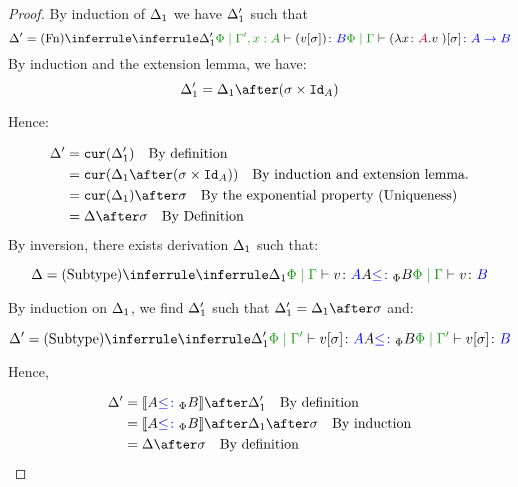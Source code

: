 \documentclass{report}
\begin{document}
\begin{framed}
\begin{proof}
        By induction of $\Delta_1$ we have $\Delta_1'$ such that
        \begin{equation}
            \D' = \ntreeruleI{\vfun}{
                \treeruleI{\D_1'}{\etyperelation{\P}{\G', x:A}{(v\ssi)}{B}}
            }{\etyperelation{\P}{\G}{(\lam{x}{A}{v})\ssi}{\ab}}
        \end{equation}
        By induction and the extension lemma, we have:
        \begin{equation}
            \D_1' = \D_1\after(\si\times\Id{A})
        \end{equation}
        
        Hence:
        
        \begin{align*}
            \D' &= \cur{\D_1'}\qt{By definition}\\
                &= \cur{\D_1\after(\si\times\Id{A})}\qt{By induction and extension lemma.}\\
                & = \cur{\D_1}\after\si\qt{By the exponential property (Uniqueness)}\\
                &= \D\after\si\qt{By Definition}\\
        \end{align*}
        \case{\vsubtype}
        By inversion, there exists derivation $\Delta_1$ such that:
        
        \begin{equation}
            \D = \ntreeruleII{\vsubtype}{\treeruleI{\D_1}{\etyperelation{\P}{\G}{v}{A}}}{ A\subtypep B}{\etyperelation{\P}{\G}{v}{B}}
        \end{equation}
        
        By induction on $\Delta_1$, we find $\Delta_1'$ such that $\D_1' = \D_1\after\si$ and:
        
        \begin{equation}
            \D' = \ntreeruleII{\vsubtype}{\treeruleI{\D_1'}{\etyperelation{\P}{\G'}{v\ssi}{A}}}{ A\subtypep B}{\etyperelation{\P}{\G'}{v\ssi}{B}}
        \end{equation}
        
        Hence,
        
        \begin{align*}
            \D' &= \deno{A\subtypep B}\after\D_1'\qt{By definition}\\
                &= \deno{A\subtypep B}\after\D_1\after\si\qt{By induction}\\
                &= \D\after\si\qt{By definition}\\
        \end{align*}
        

\end{proof}
\end{framed}
\end{document}
